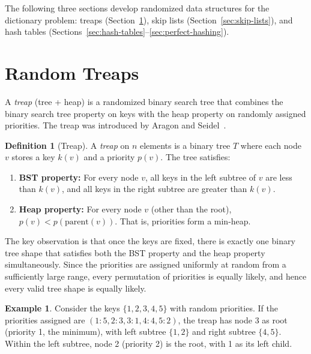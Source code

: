 \documentclass[twoside,12pt]{book}
\theoremstyle{plain}
\theoremstyle{definition}
\newtheorem{definition}[theorem]{Definition}
\newtheorem{example}[theorem]{Example}
\theoremstyle{remark}
\begin{document}
The following three sections develop randomized data structures for the dictionary problem: treaps (Section~\ref{sec:treaps}), skip lists (Section~\ref{sec:skip-lists}), and hash tables (Sections~\ref{sec:hash-tables}--\ref{sec:perfect-hashing}).

\section{Random Treaps}
\label{sec:treaps}

A \emph{treap} (tree + heap) is a randomized binary search tree that combines the binary search tree property on keys with the heap property on randomly assigned priorities. The treap was introduced by Aragon and Seidel~\cite{aron1989}.

\begin{definition}[Treap]
A \emph{treap} on $n$ elements is a binary tree $T$ where each node $v$ stores a key $k(v)$ and a priority $p(v)$. The tree satisfies:
\begin{enumerate}[nosep]
    \item \textbf{BST property:} For every node $v$, all keys in the left subtree of $v$ are less than $k(v)$, and all keys in the right subtree are greater than $k(v)$.
    \item \textbf{Heap property:} For every node $v$ (other than the root), $p(v) < p(\text{parent}(v))$. That is, priorities form a min-heap.
\end{enumerate}
\end{definition}

The key observation is that once the keys are fixed, there is exactly one binary tree shape that satisfies both the BST property and the heap property simultaneously. Since the priorities are assigned uniformly at random from a sufficiently large range, every permutation of priorities is equally likely, and hence every valid tree shape is equally likely.

\begin{example}
Consider the keys $\{1, 2, 3, 4, 5\}$ with random priorities. If the priorities assigned are $(1: 5, 2: 3, 3: 1, 4: 4, 5: 2)$, the treap has node 3 as root (priority 1, the minimum), with left subtree $\{1, 2\}$ and right subtree $\{4, 5\}$. Within the left subtree, node 2 (priority 2) is the root, with 1 as its left child.
\end{example}
\end{document}
